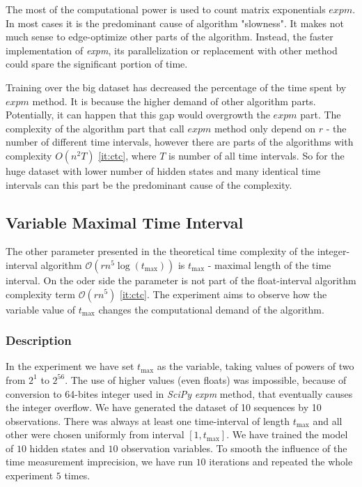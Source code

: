 \documentclass[thesis=M,english]{FITthesis}[2012/10/20]
\begin{document}
The most of the computational power is used to count matrix exponentials $expm$. In most cases it is the predominant cause of algorithm "slowness". It makes not much sense to edge-optimize other parts of the algorithm. Instead, the faster implementation of \textit{expm}, its parallelization or replacement with other method could spare the significant portion of time.      

Training over the big dataset \label{fig:e2big} has decreased the percentage of the time spent by $expm$ method. It is because the higher demand of other algorithm parts. Potentially, it can happen that this gap would overgrowth the $expm$ part. The complexity of the algorithm part that call $expm$ method only depend on $r$ - the number of different time intervals, however there are parts of the algorithms with complexity ${O}(n^2T)$ \ref{it:ctc}, where $T$ is number of all time intervals. So for the huge dataset with lower number of hidden states and many identical time intervals can this part be the predominant cause of the complexity.   

\subsection{Variable Maximal Time Interval}

The other parameter presented in the theoretical time complexity of the integer-interval algorithm $\mathcal{O}(r n^5 \log(t_{\max}))$ is $t_{\max}$ - maximal length of the time interval. On the oder side the parameter is not part of the float-interval algorithm complexity term $\mathcal{O}(r n^5)$ \ref{it:ctc}. The experiment aims to observe how the variable value of $t_{\max}$ changes the computational demand of the algorithm.  


\subsubsection*{ Description }

In the experiment we have set $t_{\max}$ as the variable, taking values of powers of two from $2^1$ to $2^{56}$. The use of higher values (even floats) was impossible, because of conversion to 64-bites integer used in \textit{SciPy} \textit{expm} method, that eventually causes the integer overflow. We have generated the dataset of 10 sequences by 10 observations. There was always at least one time-interval of length $t_{\max}$ and all other were chosen uniformly from interval $[1,t_{\max}]$. We have trained the model of $10$ hidden states and $10$ observation variables. To smooth the influence of the time measurement imprecision, we have run $10$ iterations and repeated the whole experiment $5$ times.   
\end{document}
